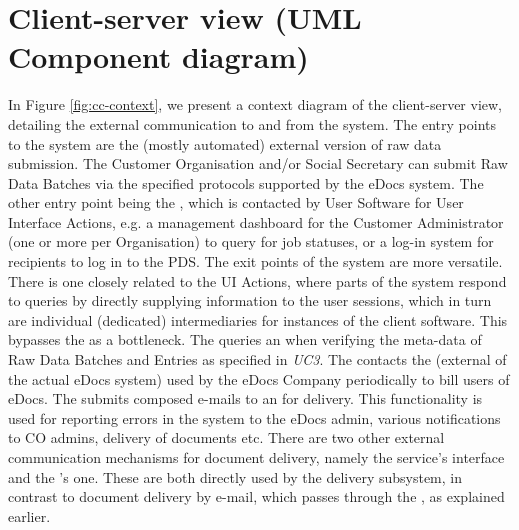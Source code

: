 \section{Client-server view (UML Component diagram)}\label{sec:client-server}
In Figure \ref{fig:cc-context}, we present a context diagram of the client-server view, detailing the external communication to and from the system. The entry points to the system are the (mostly automated) external version of raw data submission. The Customer Organisation and/or Social Secretary can submit Raw Data Batches via the specified protocols supported by the eDocs system.
The other entry point being the , which is contacted by User Software for User Interface Actions, e.g. a management dashboard for the Customer Administrator (one or more per Organisation) to query for job statuses, or a log-in system for recipients to log in to the PDS.
The exit points of the system are more versatile. There is one closely related to the UI Actions, where parts of the system respond to queries by directly supplying information to the user sessions, which in turn are individual (dedicated) intermediaries for instances of the client software. This bypasses the  as a bottleneck.
The  queries an  when verifying the meta-data of Raw Data Batches and Entries as specified in \emph{UC3}.
The  contacts the  (external of the actual eDocs system) used by the eDocs Company periodically to bill users of eDocs.
The  submits composed e-mails to an  for delivery. This functionality is used for reporting errors in the system to the eDocs admin, various notifications to CO admins, delivery of documents etc.
There are two other external communication mechanisms for document delivery, namely the  service's  interface and the 's one. These are both directly used by the delivery subsystem, in contrast to document delivery by e-mail, which passes through the , as explained earlier.

